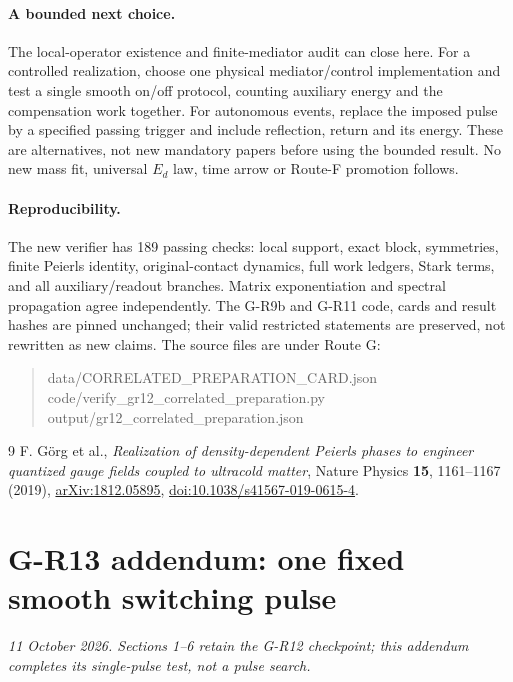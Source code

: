 \documentclass[11pt,a4paper]{article}
\begin{document}
\paragraph{A bounded next choice.}
The local-operator existence and finite-mediator audit can close here.
For a controlled realization, choose one physical mediator/control
implementation and test a single smooth on/off protocol, counting
auxiliary energy and the compensation work together. For autonomous
events, replace the imposed pulse by a specified passing trigger and
include reflection, return and its energy. These are alternatives, not
new mandatory papers before using the bounded result. No new mass fit,
universal $E_d$ law, time arrow or Route-F promotion follows.

\paragraph{Reproducibility.}
The new verifier has 189 passing checks: local support, exact block,
symmetries, finite Peierls identity, original-contact dynamics, full
work ledgers, Stark terms, and all auxiliary/readout branches.
Matrix exponentiation and spectral propagation agree independently.
The G-R9b and G-R11 code, cards and result hashes are pinned unchanged;
their valid restricted statements are preserved, not rewritten as new
claims. The source files are under Route G:
\begin{quote}\small\ttfamily
data/CORRELATED\_PREPARATION\_CARD.json\\
code/verify\_gr12\_correlated\_preparation.py\\
output/gr12\_correlated\_preparation.json
\end{quote}

\begin{thebibliography}{9}\small
{} F. G\"org et al.,
\emph{Realization of density-dependent Peierls phases to engineer
quantized gauge fields coupled to ultracold matter},
Nature Physics \textbf{15}, 1161--1167 (2019),
\href{https://arxiv.org/abs/1812.05895}{arXiv:1812.05895},
\href{https://doi.org/10.1038/s41567-019-0615-4}{doi:10.1038/s41567-019-0615-4}.
\end{thebibliography}

\newpage
\section{G-R13 addendum: one fixed smooth switching pulse}
\noindent\textit{11 October 2026. Sections 1--6 retain the G-R12 checkpoint;
this addendum completes its single-pulse test, not a pulse search.}
\end{document}
